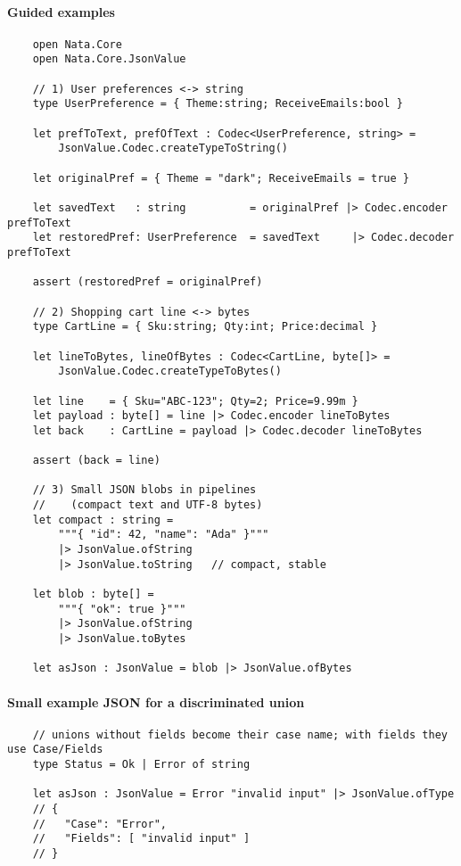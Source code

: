 \documentclass{article}
\begin{document}
\paragraph{Guided examples}
\begin{verbatim}
    open Nata.Core
    open Nata.Core.JsonValue

    // 1) User preferences <-> string
    type UserPreference = { Theme:string; ReceiveEmails:bool }

    let prefToText, prefOfText : Codec<UserPreference, string> =
        JsonValue.Codec.createTypeToString()

    let originalPref = { Theme = "dark"; ReceiveEmails = true }

    let savedText   : string          = originalPref |> Codec.encoder prefToText
    let restoredPref: UserPreference  = savedText     |> Codec.decoder prefToText

    assert (restoredPref = originalPref)

    // 2) Shopping cart line <-> bytes
    type CartLine = { Sku:string; Qty:int; Price:decimal }

    let lineToBytes, lineOfBytes : Codec<CartLine, byte[]> =
        JsonValue.Codec.createTypeToBytes()

    let line    = { Sku="ABC-123"; Qty=2; Price=9.99m }
    let payload : byte[] = line |> Codec.encoder lineToBytes
    let back    : CartLine = payload |> Codec.decoder lineToBytes

    assert (back = line)

    // 3) Small JSON blobs in pipelines
    //    (compact text and UTF-8 bytes)
    let compact : string =
        """{ "id": 42, "name": "Ada" }"""
        |> JsonValue.ofString
        |> JsonValue.toString   // compact, stable

    let blob : byte[] =
        """{ "ok": true }"""
        |> JsonValue.ofString
        |> JsonValue.toBytes

    let asJson : JsonValue = blob |> JsonValue.ofBytes
\end{verbatim}

\paragraph{Small example JSON for a discriminated union}
\begin{verbatim}
    // unions without fields become their case name; with fields they use Case/Fields
    type Status = Ok | Error of string

    let asJson : JsonValue = Error "invalid input" |> JsonValue.ofType
    // {
    //   "Case": "Error",
    //   "Fields": [ "invalid input" ]
    // }
\end{verbatim}
\end{document}
